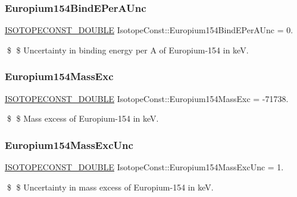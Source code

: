 \subsubsection{\texorpdfstring{Europium154\+Bind\+E\+Per\+A\+Unc}{Europium154BindEPerAUnc}}
{\footnotesize\ttfamily \mbox{\hyperlink{group___isotope_const-_macros_ga8f45a7272ce02c0b4c65c44636ed719a}{I\+S\+O\+T\+O\+P\+E\+C\+O\+N\+S\+T\+\_\+\+D\+O\+U\+B\+LE}} Isotope\+Const\+::\+Europium154\+Bind\+E\+Per\+A\+Unc = 0.}

\$ \$ Uncertainty in binding energy per A of Europium-\/154 in keV. \mbox{\label{group___isotope_const-_europium-_eu154_ga5fb748128f16f3c9e90b38c18dde48a5}} 
\subsubsection{\texorpdfstring{Europium154\+Mass\+Exc}{Europium154MassExc}}
{\footnotesize\ttfamily \mbox{\hyperlink{group___isotope_const-_macros_ga8f45a7272ce02c0b4c65c44636ed719a}{I\+S\+O\+T\+O\+P\+E\+C\+O\+N\+S\+T\+\_\+\+D\+O\+U\+B\+LE}} Isotope\+Const\+::\+Europium154\+Mass\+Exc = -\/71738.}

\$ \$ Mass excess of Europium-\/154 in keV. \mbox{\label{group___isotope_const-_europium-_eu154_ga3b801c82d807206534ce55e71b519db4}} 
\subsubsection{\texorpdfstring{Europium154\+Mass\+Exc\+Unc}{Europium154MassExcUnc}}
{\footnotesize\ttfamily \mbox{\hyperlink{group___isotope_const-_macros_ga8f45a7272ce02c0b4c65c44636ed719a}{I\+S\+O\+T\+O\+P\+E\+C\+O\+N\+S\+T\+\_\+\+D\+O\+U\+B\+LE}} Isotope\+Const\+::\+Europium154\+Mass\+Exc\+Unc = 1.}

\$ \$ Uncertainty in mass excess of Europium-\/154 in keV. \mbox{\label{group___isotope_const-_europium-_eu154_gab618a3032f96d8c6dcf79d3ec856f8fa}} 
